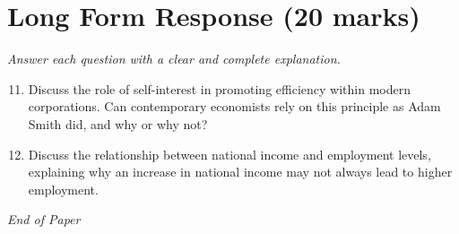 \documentclass[12pt]{article}
\begin{document}
\section*{Long Form Response (20 marks)}
\textit{Answer each question with a clear and complete explanation.}
\begin{enumerate}[label=\arabic*.]
\setcounter{enumi}{10}
\item Discuss the role of self-interest in promoting efficiency within modern corporations. Can contemporary economists rely on this principle as Adam Smith did, and why or why not?
\item Discuss the relationship between national income and employment levels, explaining why an increase in national income may not always lead to higher employment.
\end{enumerate}

\vfill
\noindent\textit{End of Paper}
\end{document}
